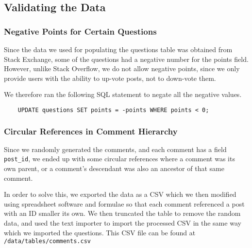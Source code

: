 \subsection{Validating the Data}

\subsubsection{Negative Points for Certain Questions}

Since the data we used for populating the questions table was obtained from Stack Exchange, some of the questions had a negative number for the points field. However, unlike Stack Overflow, we do not allow negative points, since we only provide users with the ability to up-vote posts, not to down-vote them.

We therefore ran the following SQL statement to negate all the negative values.

\begin{verbatim}
	UPDATE questions SET points = -points WHERE points < 0;
\end{verbatim}

\subsubsection{Circular References in Comment Hierarchy}

Since we randomly generated the comments, and each comment has a field \verb`post_id`, we ended up with some circular references where a comment was its own parent, or a comment's descendant was also an ancestor of that same comment.

In order to solve this, we exported the data as a CSV which we then modified using spreadsheet software and formulae so that each comment referenced a post with an ID smaller its own. We then truncated the table to remove the random data, and used the text importer to import the processed CSV in the same way which we imported the questions. This CSV file can be found at \verb`/data/tables/comments.csv`
